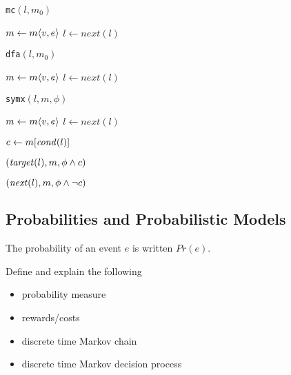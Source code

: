 \noindent\begin{minipage}[t]{0.32\textwidth}
\begin{algorithm}[H]
\renewcommand{\thealgorithm}{}
\caption{{\tt mc}$(l,m_0)$}
\label{mc}
\begin{algorithmic}
   \STATE $m \gets m\langle v, e\rangle$
   \STATE $l \gets next(l)$
 \ENDWHILE
\end{algorithmic}
\end{algorithm}
\end{minipage}%
\hfill
\begin{minipage}[t]{0.32\textwidth}
\begin{algorithm}[H]
\renewcommand{\thealgorithm}{}
\caption{{\tt dfa}$(l,m_0)$}
\label{mc}
\begin{algorithmic}
   \STATE $m \gets m\langle v, e\rangle$
   \STATE $l \gets next(l)$
 \ENDWHILE
\end{algorithmic}
\end{algorithm}
\end{minipage}%
\hfill
\begin{minipage}[t]{0.32\textwidth}
\begin{algorithm}[H]
\renewcommand{\thealgorithm}{}
\caption{{\tt symx}$(l,m,\phi)$}
\label{symexe}
\begin{algorithmic}
   \STATE $m \gets m\langle v, e\rangle$
   \STATE $l \gets next(l)$
 \ENDWHILE

 \STATE $c \gets m[\mathit{cond}(l)]$

   $(\mathit{target}(l), m, \phi \wedge c)$
 \ENDIF

   $(\mathit{next}(l), m, \phi \wedge \neg c)$
 \ENDIF
\end{algorithmic}
\end{algorithm}
\end{minipage}

\subsection{Probabilities and Probabilistic Models}
The probability of an event $e$ is written $Pr(e)$.

Define and explain the following
\begin{itemize}
\item probability measure
\item rewards/costs
\item discrete time Markov chain
\item discrete time Markov decision process
\end{itemize}

